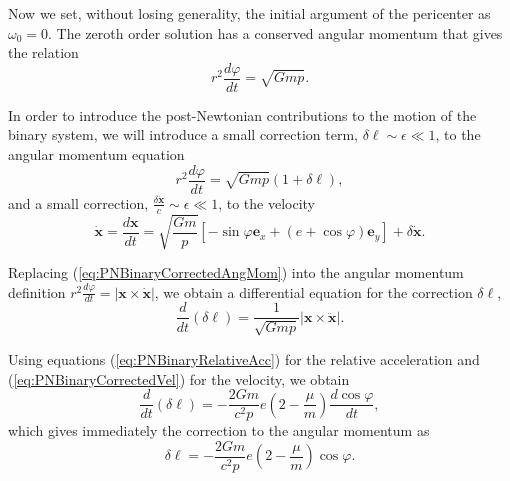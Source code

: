 Now we set, without losing generality, the initial argument of the pericenter as $\omega_0 =0$. The zeroth order solution has a conserved angular momentum that gives the relation
\begin{equation}
r^2 \frac{d\varphi}{dt} = \sqrt{Gmp}.
\end{equation}

In order to introduce the post-Newtonian contributions to the motion of the binary system, we will introduce a small correction term, $\delta \ell \sim \epsilon \ll 1$, to the angular momentum equation
\begin{equation}
r^2 \frac{d\varphi}{dt} = \sqrt{Gmp} (1 + \delta \ell), \label{eq:PNBinaryCorrectedAngMom}
\end{equation}
and a small correction, $\frac{\delta \dot{\textbf{x}}}{c} \sim \epsilon \ll 1$, to the velocity
\begin{equation}
\dot{\textbf{x}} = \frac{d \textbf{x}}{dt}  = \sqrt{\frac{Gm}{p}} \left[ -\sin \varphi \textbf{e}_x + (e+\cos \varphi)\textbf{e}_y \right] + \delta \dot{\textbf{x}}. \label{eq:PNBinaryCorrectedVel}
\end{equation}

Replacing (\ref{eq:PNBinaryCorrectedAngMom}) into the angular momentum definition $r^2 \frac{d\varphi}{dt}  = \left| \textbf{x} \times \dot{\textbf{x}}\right|$, we obtain a differential equation for the correction $\delta \ell$,
\begin{equation}
\frac{d}{dt} \left( \delta \ell \right) = \frac{1}{\sqrt{Gmp}} \left| \textbf{x} \times \ddot{\textbf{x}}\right|.
\end{equation}

Using equations (\ref{eq:PNBinaryRelativeAcc}) for the relative acceleration and (\ref{eq:PNBinaryCorrectedVel}) for the velocity, we obtain 
\begin{equation}
\frac{d}{dt} \left( \delta \ell \right) = - \frac{2Gm}{c^2 p} e \left( 2 - \frac{\mu}{m} \right) \frac{d \cos \varphi}{dt},
\end{equation}
which gives immediately the correction to the angular momentum as
 \begin{equation}
 \delta \ell  = - \frac{2Gm}{c^2 p} e \left( 2 - \frac{\mu}{m} \right) \cos \varphi . \label{eq:PNBinaryCorrectiontoAngMom}
\end{equation}

